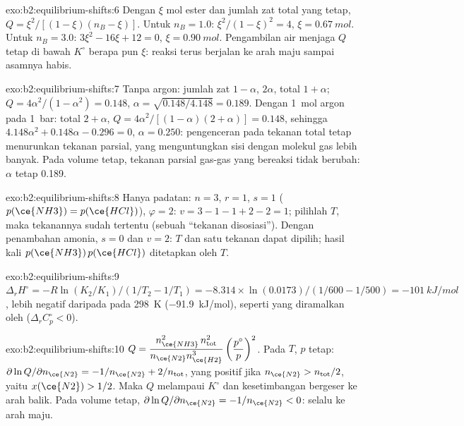 \begin{solution}{exo:b2:equilibrium-shifts:6}
Dengan $\xi$ mol ester dan jumlah zat total yang tetap, $Q =
\xi^2/[(1 - \xi)(n_B - \xi)]$. Untuk $n_B = 1.0$: $\xi^2/(1 - \xi)^2 = 4$,
$\xi
= \qty{0.67}{mol}$. Untuk $n_B = 3.0$: $3\xi^2 - 16\xi + 12 = 0$,
$\xi =
\qty{0.90}{mol}$. Pengambilan air menjaga $Q$ tetap di bawah
$K^\circ$ berapa pun $\xi$: reaksi terus berjalan ke arah maju sampai
asamnya habis.
\end{solution}

\begin{solution}{exo:b2:equilibrium-shifts:7}
Tanpa argon: jumlah zat $1 - \alpha$, $2\alpha$, total $1 + \alpha$;
$Q = 4\alpha^2/(1 - \alpha^2) = 0.148$, $\alpha = \sqrt{0.148/4.148} = 0.189$.
Dengan \qty{1}{mol} argon pada \qty{1}{bar}: total $2 + \alpha$, $Q =
4\alpha^2/[(1 - \alpha)(2 + \alpha)] = 0.148$, sehingga $4.148\alpha^2 + 0.148\alpha
- 0.296 = 0$, $\alpha = 0.250$: pengenceran pada tekanan total tetap
menurunkan tekanan parsial, yang menguntungkan sisi dengan molekul gas
lebih banyak. Pada volume tetap, tekanan parsial gas-gas yang bereaksi
tidak berubah: $\alpha$ tetap 0.189.
\end{solution}

\begin{solution}{exo:b2:equilibrium-shifts:8}
Hanya padatan: $n = 3$, $r = 1$, $s = 1$ ($p(\ce{NH3}) = p(\ce{HCl})$),
$\varphi = 2$: $v = 3 - 1 - 1 + 2 - 2 = 1$; pilihlah $T$, maka tekanannya
sudah tertentu (sebuah ``tekanan disosiasi''). Dengan penambahan amonia,
$s = 0$ dan $v = 2$: $T$ dan satu tekanan dapat dipilih; hasil kali
$p(\ce{NH3})\,p(\ce{HCl})$ ditetapkan oleh $T$.
\end{solution}

\begin{solution}{exo:b2:equilibrium-shifts:9}
$\Delta_r H^\circ = -R\ln(K_2/K_1)/(1/T_2 - 1/T_1) = -8.314 \times
\ln(0.0173)/(1/600 - 1/500) = \qty{-101}{kJ/mol}$, lebih negatif daripada
pada \qty{298}{K} (\qty{-91.9}{kJ/mol}), seperti yang diramalkan oleh
 ($\Delta_r C_p^\circ < 0$).
\end{solution}

\begin{solution}{exo:b2:equilibrium-shifts:10}
$Q = \dfrac{n_{\ce{NH3}}^2\,n_{\text{tot}}^2}{n_{\ce{N2}}n_{\ce{H2}}^3}
\left(\dfrac{p^\circ}{p}\right)^2$. Pada $T$, $p$ tetap:
$\partial\ln Q/\partial n_{\ce{N2}} = -1/n_{\ce{N2}} + 2/n_{\text{tot}}$,
yang positif jika $n_{\ce{N2}} > n_{\text{tot}}/2$, yaitu
$x(\ce{N2}) > 1/2$. Maka $Q$ melampaui $K^\circ$ dan kesetimbangan
bergeser ke arah balik. Pada volume tetap,
$\partial\ln Q/\partial n_{\ce{N2}} = -1/n_{\ce{N2}} < 0$: selalu ke arah
maju.
\end{solution}


